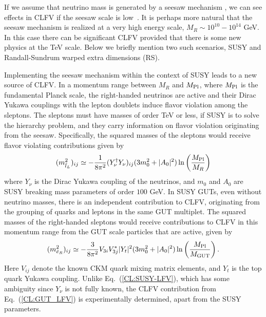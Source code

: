 

If we assume that neutrino mass is generated by a seesaw mechanism \cite{Minkowski:1977sc}, we can see effects in CLFV if the seesaw scale is low~\cite{deGouvea:2007uz}. It is perhaps more natural that the seesaw mechanism
is realized at a very high energy scale, $M_R \sim 10^{10} - 10^{14}$
GeV. In this case there can be significant CLFV provided that there is
some new physics at the TeV scale. Below we briefly mention two such
scenarios, SUSY and Randall-Sundrum warped extra dimensions (RS).

Implementing the seesaw mechanism within the context of SUSY leads to
a new source of CLFV. In a momentum range  between $M_R$ and  $M_{\rm
Pl}$, where $M_{\rm Pl}$ is the fundamental Planck scale, the
right-handed neutrinos are active and their Dirac
Yukawa couplings with the lepton doublets induce flavor
violation among the sleptons.  The sleptons must have masses of order
TeV or less, if SUSY is to solve the hierarchy problem, and they carry
information on flavor violation originating from the seesaw.
Specifically, the squared masses of the sleptons would receive flavor
violating contributions given by
\begin{equation}
(m_{\tilde{l}_{L}}^{2})_{ij} \simeq -\frac{1}{8\pi^{2}}
(Y_{\nu}^\dagger Y_{\nu})_{ij} (3 m_{0}^{2} + |A_{0}|^{2})\ln\left({M_{\rm
Pl}\over M_{R}}\right)
\label{CL:SUSY-LFV}
\end{equation}
where $Y_\nu$ is the Dirac Yukawa coupling of the neutrinos, and $m_0$
and $A_0$ are SUSY breaking mass parameters of order $100$ GeV.  In
SUSY GUTs, even without neutrino masses, there is an independent
contribution to CLFV, originating from the grouping of quarks and
leptons in the same GUT multiplet.   The squared masses of
the right-handed sleptons would receive contributions to CLFV in this momentum range from the GUT
scale particles that are active, given by
\begin{equation}
(m_{\tilde{e}_{R}}^{2})_{ij} \simeq -\frac{3}{8\pi^{2}}
V_{3i}V_{3j}^{*}|Y_t|^{2}(3 m_{0}^{2}  +
|A_{0}|^{2})\ln\left(\frac{M_{\rm Pl}}{M_{{\rm GUT}}}\right).
\label{CL:GUT_LFV}
\end{equation}
Here $V_{ij}$ denote the known CKM quark mixing matrix elements, and
$Y_t$ is the top quark Yukawa coupling.  Unlike
Eq.~(\ref{CL:SUSY-LFV}), which has some ambiguity since $Y_\nu$ is not
fully known, the CLFV contribution from Eq.~(\ref{CL:GUT_LFV}) is
experimentally determined, apart from the SUSY parameters. 

